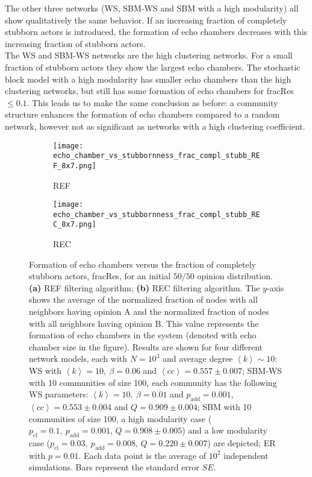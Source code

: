 \documentclass[11 pt , letterpaper , twoside , openright]{book}
\begin{document}
\newline
The other three networks (WS, SBM-WS and SBM with a high modularity) all show qualitatively the same behavior. If an increasing fraction of completely stubborn actors is introduced, the formation of echo chambers decreases with this increasing fraction of stubborn actors.\\
\newline
The WS and SBM-WS networks are the high clustering networks. For a small fraction of stubborn actors they show the largest echo chambers. The stochastic block model with a high modularity has smaller echo chambers than the high clustering networks, but still has some formation of echo chambers for fracRes $\leqslant 0.1$. This leads us to make the same conclusion as before: a community structure enhances the formation of echo chambers compared to a random network, however not as significant as networks with a high clustering coefficient.
\begin{figure}[H]
  \begin{subfigure}[t]{0.49\textwidth}
    \caption{REF}
  	\texttt{[image: echo\_chamber\_vs\_stubbornness\_frac\_compl\_stubb\_REF\_8x7.png]}
  \end{subfigure}
  \begin{subfigure}[t]{0.49\textwidth}
    \caption{REC}
  	\texttt{[image: echo\_chamber\_vs\_stubbornness\_frac\_compl\_stubb\_REC\_8x7.png]}
    \label{REC_frac_compl_stubb}
  \end{subfigure}
  \captionsetup{format=plain}
  \caption[Formation of echo chambers versus fraction of completely stubborn actors for the REF and REC filtering algorithms and an initial $50/50$ opinion distribution.]{Formation of echo chambers versus the fraction of completely stubborn actors, fracRes, for an initial $50/50$ opinion distribution. \textbf{(a)} REF filtering algorithm; \textbf{(b)} REC filtering algorithm. The $y$-axis shows the average of the normalized fraction of nodes with all neighbors having opinion A and the normalized fraction of nodes with all neighbors having opinion B. This value represents the formation of echo chambers in the system (denoted with echo chamber size in the figure). Results are shown for four different network models, each with $N=10^3$ and average degree $\left<k\right> \sim 10$: WS with $\left<k\right> =10,\ \beta = 0.06$ and $\left<cc \right> = 0.557 \pm 0.007$; SBM-WS with 10 communities of size 100, each community has the following WS parameters: $\left<k\right> = 10,\ \beta = 0.01$ and $p_{\text{add}} = 0.001$, $\left<cc\right> = 0.553 \pm 0.004$ and $Q = 0.909 \pm 0.004$; SBM with 10 communities of size 100, a high modularity case ($p_{\text{cl}} = 0.1,\ p_{\text{add}} = 0.001$, $Q = 0.908 \pm 0.005$) and a low modularity case ($p_{\text{cl}} = 0.03,\ p_{\text{add}} = 0.008$, $Q = 0.220 \pm 0.007$) are depicted; ER with $p= 0.01$. Each data point is the average of $10^2$ independent simulations. Bars represent the standard error $SE$.}
\label{echo_vs_frac_complStubb_REF-REC}
\end{figure}
\end{document}
